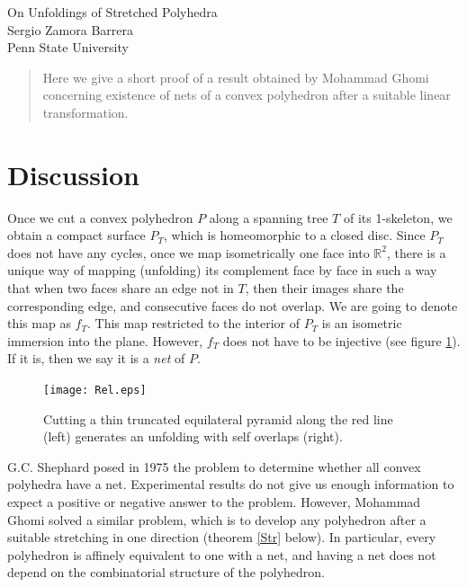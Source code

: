 \documentclass[openright, 12pt]{article}
\newcommand{\field}[1]{\ensuremath{\mathbb{#1}}}
\newcommand{\R}{\field{R}}
\begin{document}
\begin{center}
\Large{On Unfoldings of Stretched Polyhedra}\\
\normalsize{ Sergio Zamora Barrera}\\
Penn State University
\end{center}



\begin{abstract}
\noindent Here we give a short proof of a result obtained by Mohammad Ghomi concerning existence of nets of a convex polyhedron after a suitable linear transformation.

\end{abstract}


\section*{Discussion}


Once we cut a convex polyhedron $P$ along a spanning tree $T$ of its 1-skeleton, we obtain a compact surface $P_T$, which is homeomorphic to a closed disc. Since $P_T$ does not have any cycles, once we map isometrically one face into $\R^2$, there is a unique way of mapping (unfolding) its complement face by face in such a way that when two faces share an edge not in $T$, then their images share the corresponding edge, and consecutive faces do not overlap. We are going to denote this map as $f_T$. This map restricted to the interior of $P_T$ is an isometric immersion into the plane. However, $f_T$ does not have to be injective (see figure \ref{Tet}). If it is, then we say it is a \textit{net} of $P$.




\begin{figure}[h]
\centering
\texttt{[image: Rel.eps]}
\caption{Cutting a thin truncated equilateral pyramid along the red line (left) generates an unfolding with self overlaps (right).}\label{Tet}
\end{figure}











G.C. Shephard \cite{Sh} posed in 1975 the problem to determine whether all convex polyhedra have a net. Experimental results do not give us enough information to expect a positive or negative answer to the problem. However, Mohammad Ghomi solved a similar problem, which is to develop any polyhedron after a suitable stretching in one direction (theorem \ref{Str} below). In particular, every polyhedron is affinely equivalent to one with a net, and having a net does not depend on the combinatorial structure of the polyhedron. 
\end{document}
